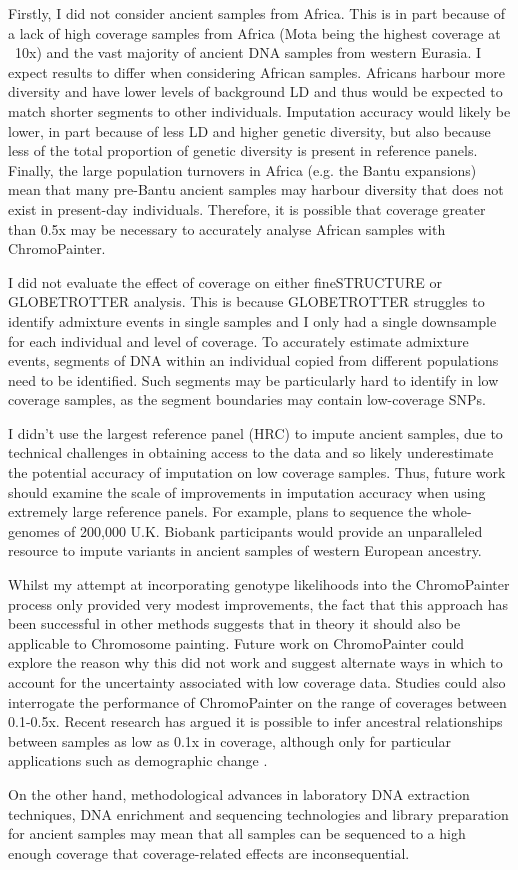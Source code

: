 Firstly, I did not consider ancient samples from Africa. This is in part because of a lack of high coverage samples from Africa (Mota being the highest coverage at ~10x) and the vast majority of ancient DNA samples from western Eurasia. I expect results to differ when considering African samples. Africans harbour more diversity and have lower levels of background LD \cite{bosch2009decay} and thus would be expected to match shorter segments to other individuals. Imputation accuracy would likely be lower, in part because of less LD and higher genetic diversity, but also because less of the total proportion of genetic diversity is present in reference panels. Finally, the large population turnovers in Africa (e.g. the Bantu expansions) mean that many pre-Bantu ancient samples may harbour diversity that does not exist in present-day individuals. Therefore, it is possible that coverage greater than 0.5x may be necessary to accurately analyse African samples with ChromoPainter. 

I did not evaluate the effect of coverage on either fineSTRUCTURE or GLOBETROTTER analysis. This is because GLOBETROTTER struggles to identify admixture events in single samples and I only had a single downsample for each individual and level of coverage. To accurately estimate admixture events, segments of DNA within an individual copied from different populations need to be identified. Such segments may be particularly hard to identify in low coverage samples, as the segment boundaries may contain low-coverage SNPs.   

I didn't use the largest reference panel (HRC) to impute ancient samples, due to technical challenges in obtaining access to the data and so likely underestimate the potential accuracy of imputation on low coverage samples. Thus, future work should examine the scale of improvements in imputation accuracy when using extremely large reference panels. For example, plans to sequence the whole-genomes of 200,000 U.K. Biobank participants would provide an unparalleled resource to impute variants in ancient samples of western European ancestry. 

Whilst my attempt at incorporating genotype likelihoods into the ChromoPainter process only provided very modest improvements, the fact that this approach has been successful in other methods \cite{ngsLD, vieira2016estimating, Meisner719, Lipatov023374} suggests that in theory it should also be applicable to Chromosome painting. Future work on ChromoPainter could explore the reason why this did not work and suggest alternate ways in which to account for the uncertainty associated with low coverage data. Studies could also interrogate the performance of ChromoPainter on the range of coverages between 0.1-0.5x. Recent research has argued it is possible to infer ancestral relationships between samples as low as 0.1x in coverage, although only for particular applications such as demographic change \cite{colate}.

On the other hand, methodological advances in laboratory DNA extraction techniques, DNA enrichment and sequencing technologies and library preparation for ancient samples may mean that all samples can be sequenced to a high enough coverage that coverage-related effects are inconsequential. 




